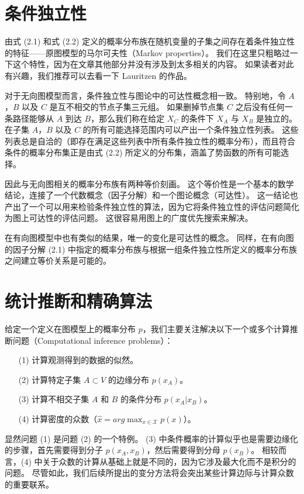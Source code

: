 \section{条件独立性}

由式 (2.1) 和式 (2.2) 定义的概率分布族在随机变量的子集之间存在着条件独立性的特征——原图模型的马尔可夫性（Markov properties）。
我们在这里只粗略过一下这个特性，因为在文章其他部分并没有涉及到太多相关的内容。
如果读者对此有兴趣，我们推荐可以去看一下 Lauritzen 的作品。

对于无向图模型而言，条件独立性与图论中的可达性概念相一致。
特别地，令 $A$，$B$ 以及 $C$ 是互不相交的节点子集三元组。
如果删掉节点集 $C$ 之后没有任何一条路径能够从 $A$ 到达 $B$，那么我们称在给定 $X_C$ 的条件下 $X_A$ 与 $X_B$ 是独立的。
在子集 $A$，$B$ 以及 $C$ 的所有可能选择范围内可以产出一个条件独立性列表。
这些列表总是自洽的（即存在满足这些列表中所有条件独立性的概率分布），而且符合条件的概率分布集正是由式 (2.2) 所定义的分布集，涵盖了势函数的所有可能选择。

因此与无向图相关的概率分布族有两种等价刻画。
这个等价性是一个基本的数学结论，连接了一个代数概念（因子分解）和一个图论概念（可达性）。
这一结论也产出了一个可以用来检验条件独立性的算法，因为它将条件独立性的评估问题简化为图上可达性的评估问题。
这很容易用图上的广度优先搜索来解决。

在有向图模型中也有类似的结果，唯一的变化是可达性的概念。
同样，在有向图的因子分解 (2.1) 中指定的概率分布族与根据一组条件独立性所定义的概率分布族之间建立等价关系是可能的。

\section{统计推断和精确算法}

给定一个定义在图模型上的概率分布 $p$，我们主要关注解决以下一个或多个计算推断问题（Computational inference problems）：

\begin{enumerate}
    \item[(1)] 计算观测得到的数据的似然。
    \item[(2)] 计算特定子集 $A \subset V$ 的边缘分布 $p(x_A)$。
    \item[(3)] 计算不相交子集 $A$ 和 $B$ 的条件分布 $p(x_A|x_B)$。
    \item[(4)] 计算密度的众数（$\hat{x} = arg\max_{x \in \mathcal{X}}p(x)$）。
\end{enumerate}

显然问题 (1) 是问题 (2) 的一个特例。
(3) 中条件概率的计算似乎也是需要边缘化的步骤，首先需要得到分子 $p(x_A, x_B)$，然后需要得到分母 $p(x_B)$。
相较而言，(4) 中关于众数的计算从基础上就是不同的，因为它涉及最大化而不是积分的问题。
尽管如此，我们后续所提出的变分方法将会突出某些计算边际与计算众数的重要联系。

